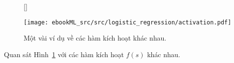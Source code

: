 \begin{figure}[t]
[\FBwidth]
{\caption{
Một vài ví dụ về các hàm kích hoạt khác nhau.
}
\label{fig:10_activation}}
{ %
\texttt{[image: ebookML\_src/src/logistic\_regression/activation.pdf]}
}
\end{figure}
Quan sát Hình~\ref{fig:10_activation} với các hàm kích hoạt $f(s)$ khác nhau.
